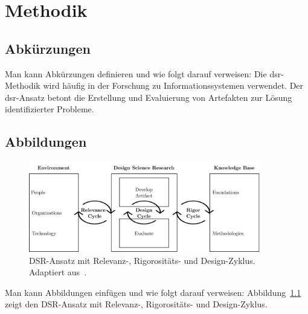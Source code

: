 \chapter{Methodik}
\label{chap:methodology}

\section{Abkürzungen}

Man kann Abkürzungen definieren und wie folgt darauf verweisen: Die \gls{dsr}-Methodik wird häufig in der Forschung zu Informationssystemen verwendet. Der \gls{dsr}-Ansatz betont die Erstellung und Evaluierung von Artefakten zur Lösung identifizierter Probleme.

\section{Abbildungen}

\begin{figure}[htbp!]
    \centering
    \includegraphics[width=0.9\textwidth]{figures/design-science-generic.png}
    \caption[DSR-Ansatz mit Relevanz-, Rigorositäts- und Design-Zyklus.]{DSR-Ansatz mit Relevanz-, Rigorositäts- und Design-Zyklus. Adaptiert aus~\textcite{hevner2004design}.}
    \label{fig:design-science-generic}
\end{figure}

Man kann Abbildungen einfügen und wie folgt darauf verweisen: Abbildung~\ref{fig:design-science-generic} zeigt den DSR-Ansatz mit Relevanz-, Rigorositäts- und Design-Zyklus.
